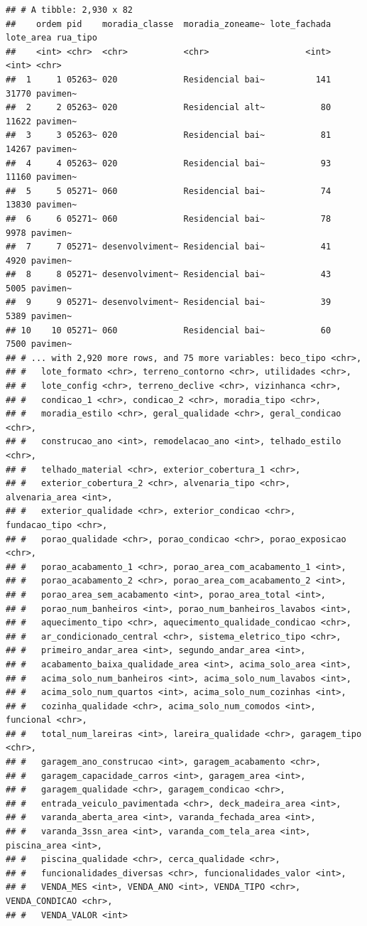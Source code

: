 \documentclass[
]{book}
\begin{document}
\begin{verbatim}
## # A tibble: 2,930 x 82
##    ordem pid    moradia_classe  moradia_zoneame~ lote_fachada lote_area rua_tipo
##    <int> <chr>  <chr>           <chr>                   <int>     <int> <chr>   
##  1     1 05263~ 020             Residencial bai~          141     31770 pavimen~
##  2     2 05263~ 020             Residencial alt~           80     11622 pavimen~
##  3     3 05263~ 020             Residencial bai~           81     14267 pavimen~
##  4     4 05263~ 020             Residencial bai~           93     11160 pavimen~
##  5     5 05271~ 060             Residencial bai~           74     13830 pavimen~
##  6     6 05271~ 060             Residencial bai~           78      9978 pavimen~
##  7     7 05271~ desenvolviment~ Residencial bai~           41      4920 pavimen~
##  8     8 05271~ desenvolviment~ Residencial bai~           43      5005 pavimen~
##  9     9 05271~ desenvolviment~ Residencial bai~           39      5389 pavimen~
## 10    10 05271~ 060             Residencial bai~           60      7500 pavimen~
## # ... with 2,920 more rows, and 75 more variables: beco_tipo <chr>,
## #   lote_formato <chr>, terreno_contorno <chr>, utilidades <chr>,
## #   lote_config <chr>, terreno_declive <chr>, vizinhanca <chr>,
## #   condicao_1 <chr>, condicao_2 <chr>, moradia_tipo <chr>,
## #   moradia_estilo <chr>, geral_qualidade <chr>, geral_condicao <chr>,
## #   construcao_ano <int>, remodelacao_ano <int>, telhado_estilo <chr>,
## #   telhado_material <chr>, exterior_cobertura_1 <chr>,
## #   exterior_cobertura_2 <chr>, alvenaria_tipo <chr>, alvenaria_area <int>,
## #   exterior_qualidade <chr>, exterior_condicao <chr>, fundacao_tipo <chr>,
## #   porao_qualidade <chr>, porao_condicao <chr>, porao_exposicao <chr>,
## #   porao_acabamento_1 <chr>, porao_area_com_acabamento_1 <int>,
## #   porao_acabamento_2 <chr>, porao_area_com_acabamento_2 <int>,
## #   porao_area_sem_acabamento <int>, porao_area_total <int>,
## #   porao_num_banheiros <int>, porao_num_banheiros_lavabos <int>,
## #   aquecimento_tipo <chr>, aquecimento_qualidade_condicao <chr>,
## #   ar_condicionado_central <chr>, sistema_eletrico_tipo <chr>,
## #   primeiro_andar_area <int>, segundo_andar_area <int>,
## #   acabamento_baixa_qualidade_area <int>, acima_solo_area <int>,
## #   acima_solo_num_banheiros <int>, acima_solo_num_lavabos <int>,
## #   acima_solo_num_quartos <int>, acima_solo_num_cozinhas <int>,
## #   cozinha_qualidade <chr>, acima_solo_num_comodos <int>, funcional <chr>,
## #   total_num_lareiras <int>, lareira_qualidade <chr>, garagem_tipo <chr>,
## #   garagem_ano_construcao <int>, garagem_acabamento <chr>,
## #   garagem_capacidade_carros <int>, garagem_area <int>,
## #   garagem_qualidade <chr>, garagem_condicao <chr>,
## #   entrada_veiculo_pavimentada <chr>, deck_madeira_area <int>,
## #   varanda_aberta_area <int>, varanda_fechada_area <int>,
## #   varanda_3ssn_area <int>, varanda_com_tela_area <int>, piscina_area <int>,
## #   piscina_qualidade <chr>, cerca_qualidade <chr>,
## #   funcionalidades_diversas <chr>, funcionalidades_valor <int>,
## #   VENDA_MES <int>, VENDA_ANO <int>, VENDA_TIPO <chr>, VENDA_CONDICAO <chr>,
## #   VENDA_VALOR <int>
\end{verbatim}
\end{document}
